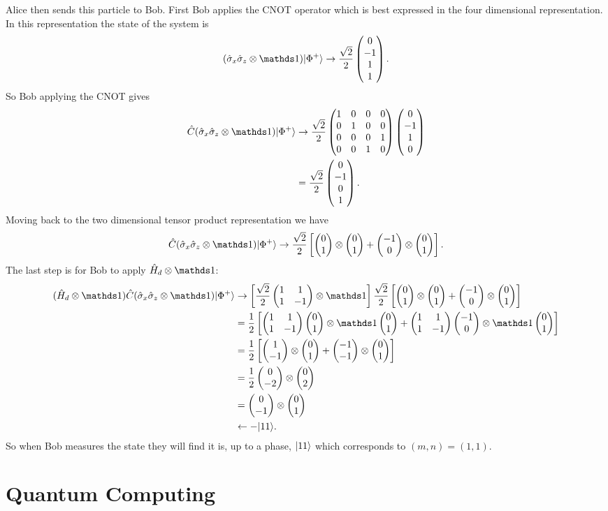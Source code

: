     Alice then sends this particle to Bob.
    First Bob applies the CNOT operator which is best expressed in the four dimensional representation.
    In this representation the state of the system is
    \[(\operator{\sigma}_x\operator{\sigma}_z\tensorProd\ident)\ket{\Phi^+} \representation \frac{\sqrt{2}}{2}\fourVec{0}{-1}{1}{1}.\]
    So Bob applying the CNOT gives
    \begin{align*}
        \operator{C}(\operator{\sigma}_x\operator{\sigma}_z\tensorProd\ident)\ket{\Phi^+} &\representation \frac{\sqrt{2}}{2}\CNOT\fourVec{0}{-1}{1}{0}\\
        &= \frac{\sqrt{2}}{2}\fourVec{0}{-1}{0}{1}.
    \end{align*}
    Moving back to the two dimensional tensor product representation we have
    \[\operator{C}(\operator{\sigma}_x\operator{\sigma}_z\tensorProd\ident)\ket{\Phi^+} \representation \frac{\sqrt{2}}{2}\left[\twoVec{0}{1} \tensorProd \twoVec{0}{1} + \twoVec{-1}{0} \tensorProd \twoVec{0}{1} \right].\]
    The last step is for Bob to apply \(\operator{H}_d\tensorProd\ident\):
    \begin{align*}
        (\operator{H}_d\tensorProd\ident)\operator{C}(\operator{\sigma}_x\operator{\sigma}_z\tensorProd\ident)\ket{\Phi^+} &\representation \left[\frac{\sqrt{2}}{2} \twoMat{1}{1}{1}{-1}\tensorProd\ident\right] \frac{\sqrt{2}}{2} \left[\twoVec{0}{1} \tensorProd \twoVec{0}{1} + \twoVec{-1}{0} \tensorProd \twoVec{0}{1} \right]\\
        &= \frac{1}{2}\left[\twoMat{1}{1}{1}{-1} \twoVec{0}{1} \tensorProd \ident \twoVec{0}{1} + \twoMat{1}{1}{1}{-1} \twoVec{-1}{0} \tensorProd \ident \twoVec{0}{1} \right]\\
        &= \frac{1}{2}\left[\twoVec{1}{-1} \tensorProd \twoVec{0}{1} + \twoVec{-1}{-1} \tensorProd \twoVec{0}{1} \right]\\
        &= \frac{1}{2} \twoVec{0}{-2}\tensorProd \twoVec{0}{2}\\
        &= \twoVec{0}{-1}\tensorProd \twoVec{0}{1}\\
        &\leftarrow -\ket{11}.
    \end{align*}
    So when Bob measures the state they will find it is, up to a phase, \(\vert {11} \rangle\) which corresponds to \((m, n) = (1, 1)\).
    
    \section{Quantum Computing}
